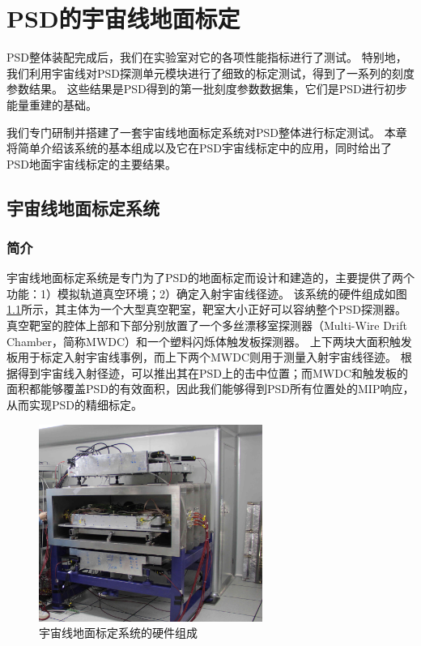 \chapter{PSD的宇宙线地面标定}
\label{ch:cosmic_ray}
PSD整体装配完成后，我们在实验室对它的各项性能指标进行了测试。
特别地，我们利用宇宙线对PSD探测单元模块进行了细致的标定测试，得到了一系列的刻度参数结果。
这些结果是PSD得到的第一批刻度参数数据集，它们是PSD进行初步能量重建的基础。

我们专门研制并搭建了一套宇宙线地面标定系统对PSD整体进行标定测试。
本章将简单介绍该系统的基本组成以及它在PSD宇宙线标定中的应用，同时给出了PSD地面宇宙线标定的主要结果。

\section{宇宙线地面标定系统}
\label{sec:cosmic_ray:cm_system}
\subsection{简介}
\label{sec:cosmic_ray:introduction}
宇宙线地面标定系统是专门为了PSD的地面标定而设计和建造的，主要提供了两个功能：1）模拟轨道真空环境；2）确定入射宇宙线径迹。
该系统的硬件组成如图\ref{fig:cosmic_ray:cm_system}所示，其主体为一个大型真空靶室，靶室大小正好可以容纳整个PSD探测器。
真空靶室的腔体上部和下部分别放置了一个多丝漂移室探测器（Multi-Wire Drift Chamber，简称MWDC）和一个塑料闪烁体触发板探测器。
上下两块大面积触发板用于标定入射宇宙线事例，而上下两个MWDC则用于测量入射宇宙线径迹。
根据得到宇宙线入射径迹，可以推出其在PSD上的击中位置；而MWDC和触发板的面积都能够覆盖PSD的有效面积，因此我们能够得到PSD所有位置处的MIP响应，从而实现PSD的精细标定。
\begin{figure}[htbp]
	\centering
	\includegraphics[width=0.65\textwidth]{chap/cosmic_ray/fig/cm_system.jpg}
	\caption{宇宙线地面标定系统的硬件组成}
	\label{fig:cosmic_ray:cm_system}
\end{figure}

